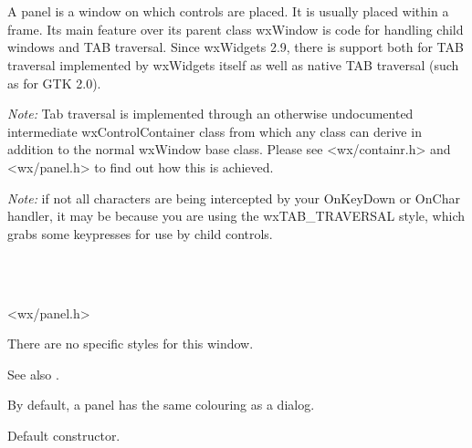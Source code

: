 \section{}\label{wxpanel}

A panel is a window on which controls are placed. It is usually placed within
a frame. Its main feature over its parent class wxWindow is code for handling
child windows and TAB traversal. Since wxWidgets 2.9, there is support both
for TAB traversal implemented by wxWidgets itself as well as native TAB
traversal (such as for GTK 2.0).

{\it Note:} Tab traversal is implemented through an otherwise undocumented
intermediate wxControlContainer class from which any class can derive
in addition to the normal wxWindow base class. Please see <wx/containr.h>
and <wx/panel.h> to find out how this is achieved.

{\it Note:} if not all characters are being intercepted by your OnKeyDown or
OnChar handler, it may be because you are using the wxTAB\_TRAVERSAL style, 
which grabs some keypresses for use by child controls.


\\
\\


<wx/panel.h>


There are no specific styles for this window.

See also .


By default, a panel has the same colouring as a dialog.




\label{wxpanelctor}


Default constructor.


